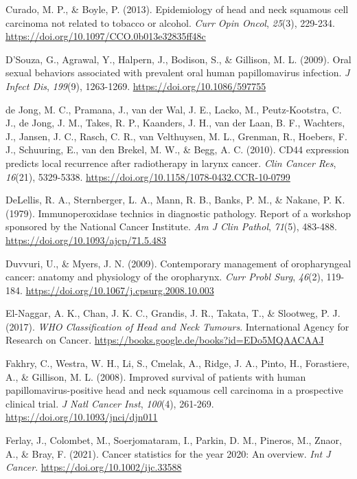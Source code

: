 Curado, M. P., \& Boyle, P. (2013). Epidemiology of head and neck squamous cell carcinoma not related to tobacco or alcohol. \emph{Curr Opin Oncol}, \emph{25}(3), 229-234. \url{https://doi.org/10.1097/CCO.0b013e32835ff48c}

D'Souza, G., Agrawal, Y., Halpern, J., Bodison, S., \& Gillison, M. L. (2009). Oral sexual behaviors associated with prevalent oral human papillomavirus infection. \emph{J Infect Dis}, \emph{199}(9), 1263-1269. \url{https://doi.org/10.1086/597755}

de Jong, M. C., Pramana, J., van der Wal, J. E., Lacko, M., Peutz-Kootstra, C. J., de Jong, J. M., Takes, R. P., Kaanders, J. H., van der Laan, B. F., Wachters, J., Jansen, J. C., Rasch, C. R., van Velthuysen, M. L., Grenman, R., Hoebers, F. J., Schuuring, E., van den Brekel, M. W., \& Begg, A. C. (2010). CD44 expression predicts local recurrence after radiotherapy in larynx cancer. \emph{Clin Cancer Res}, \emph{16}(21), 5329-5338. \url{https://doi.org/10.1158/1078-0432.CCR-10-0799}

DeLellis, R. A., Sternberger, L. A., Mann, R. B., Banks, P. M., \& Nakane, P. K. (1979). Immunoperoxidase technics in diagnostic pathology. Report of a workshop sponsored by the National Cancer Institute. \emph{Am J Clin Pathol}, \emph{71}(5), 483-488. \url{https://doi.org/10.1093/ajcp/71.5.483}

Duvvuri, U., \& Myers, J. N. (2009). Contemporary management of oropharyngeal cancer: anatomy and physiology of the oropharynx. \emph{Curr Probl Surg}, \emph{46}(2), 119-184. \url{https://doi.org/10.1067/j.cpsurg.2008.10.003}

El-Naggar, A. K., Chan, J. K. C., Grandis, J. R., Takata, T., \& Slootweg, P. J. (2017). \emph{WHO Classification of Head and Neck Tumours}. International Agency for Research on Cancer. \url{https://books.google.de/books?id=EDo5MQAACAAJ}

Fakhry, C., Westra, W. H., Li, S., Cmelak, A., Ridge, J. A., Pinto, H., Forastiere, A., \& Gillison, M. L. (2008). Improved survival of patients with human papillomavirus-positive head and neck squamous cell carcinoma in a prospective clinical trial. \emph{J Natl Cancer Inst}, \emph{100}(4), 261-269. \url{https://doi.org/10.1093/jnci/djn011}

Ferlay, J., Colombet, M., Soerjomataram, I., Parkin, D. M., Pineros, M., Znaor, A., \& Bray, F. (2021). Cancer statistics for the year 2020: An overview. \emph{Int J Cancer}. \url{https://doi.org/10.1002/ijc.33588}

